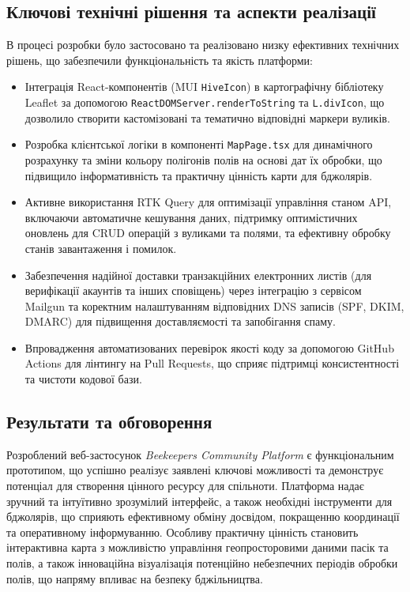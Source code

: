 \subsection*{Ключові технічні рішення та аспекти реалізації}
В процесі розробки було застосовано та реалізовано низку ефективних технічних рішень, що забезпечили функціональність та якість платформи:
\begin{itemize}
    \item Інтеграція React-компонентів (MUI \texttt{HiveIcon}) в картографічну бібліотеку Leaflet за допомогою 
\texttt{ReactDOMServer.renderToString} та \texttt{L.divIcon}, що дозволило створити кастомізовані та тематично відповідні маркери вуликів.
    \item Розробка клієнтської логіки в компоненті \texttt{MapPage.tsx} для динамічного розрахунку та зміни кольору полігонів полів на основі дат їх обробки, що підвищило інформативність та практичну цінність карти для бджолярів.
    \item Активне використання RTK Query для оптимізації управління станом API, включаючи автоматичне кешування даних, підтримку оптимістичних оновлень для CRUD операцій з вуликами та полями, та ефективну обробку станів завантаження і помилок.
    \item Забезпечення надійної доставки транзакційних електронних листів (для верифікації акаунтів та інших сповіщень) через інтеграцію з сервісом Mailgun та коректним налаштуванням відповідних DNS записів (SPF, DKIM, DMARC) для підвищення доставляємості та запобігання спаму.
    \item Впровадження автоматизованих перевірок якості коду за допомогою GitHub Actions для лінтингу на Pull Requests, що сприяє підтримці консистентності та чистоти кодової бази.
\end{itemize}

\subsection*{Результати та обговорення}
Розроблений веб-застосунок \textit{Beekeepers Community Platform} є функціональним прототипом, що успішно реалізує заявлені ключові можливості та демонструє потенціал для створення цінного ресурсу для спільноти. Платформа надає зручний та інтуїтивно зрозумілий інтерфейс, а також необхідні інструменти для бджолярів, що сприяють ефективному обміну досвідом, покращенню координації та оперативному інформуванню. Особливу практичну цінність становить інтерактивна карта з можливістю управління геопросторовими даними пасік та полів, а також інноваційна візуалізація потенційно небезпечних періодів обробки полів, що напряму впливає на безпеку бджільництва.

